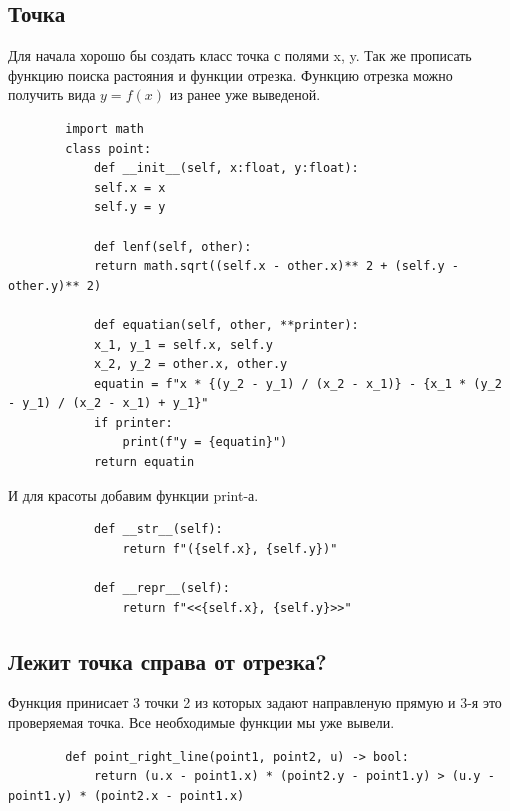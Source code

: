 \documentclass[12pt]{article} %
\begin{document}
 	 \subsection{Точка}
 	 \hspace*{1cm}Для начала хорошо бы создать класс точка с полями x, y. Так же прописать функцию поиска растояния и функции отрезка. Функцию отрезка можно получить вида $y=f(x)$ из ранее уже выведеной.
 	 \begin{verbatim}
 	 	import math
 	 	class point:
 	 	    def __init__(self, x:float, y:float):
 	 	    self.x = x
 	 	    self.y = y
 	 	
 	 	    def lenf(self, other):
 	 	    return math.sqrt((self.x - other.x)** 2 + (self.y - other.y)** 2)
 	 	
 	 	    def equatian(self, other, **printer):
 	 	    x_1, y_1 = self.x, self.y
 	 	    x_2, y_2 = other.x, other.y
 	 	    equatin = f"x * {(y_2 - y_1) / (x_2 - x_1)} - {x_1 * (y_2 - y_1) / (x_2 - x_1) + y_1}"
 	 	    if printer:
 	 	        print(f"y = {equatin}")
 	 	    return equatin
 	 \end{verbatim}
 	 И для красоты добавим функции print-а.
 	 \begin{verbatim}
 	 	    def __str__(self):
 	 	        return f"({self.x}, {self.y})"
 	 	    
 	 	    def __repr__(self):
 	 	        return f"<<{self.x}, {self.y}>>"
 	 \end{verbatim}
 	 \subsection{Лежит точка справа от отрезка?}
 	 \hspace*{1cm}Функция принисает 3 точки 2 из которых задают направленую прямую и 3-я это проверяемая точка. Все необходимые функции мы уже вывели.
 	 \begin{verbatim}
 	 	def point_right_line(point1, point2, u) -> bool:
 	 	    return (u.x - point1.x) * (point2.y - point1.y) > (u.y - point1.y) * (point2.x - point1.x)
 	 \end{verbatim}
\end{document}

